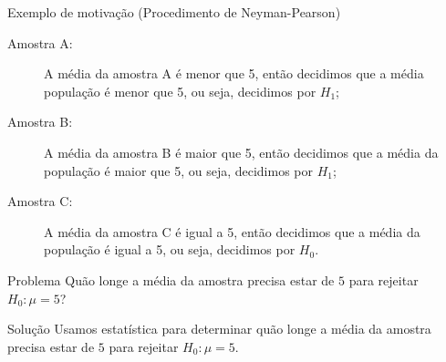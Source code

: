 \documentclass[8pt]{beamer}
\begin{document}
\begin{frame}{Exemplo de motivação (Procedimento de Neyman-Pearson)}

\begin{description}
 \item[Amostra A:] A média da amostra A é menor que 5, então decidimos que a média população é menor que 5, ou seja, decidimos por $H_1$;
 \vfill
 
 \item[Amostra B:] A média da amostra B é maior que 5, então decidimos que a média da população é maior que 5, ou seja, decidimos por $H_1$;
 \vfill
 
 \item[Amostra C:] A média da amostra C é igual a 5, então decidimos que a média da população é igual a 5, ou seja, decidimos por $H_0$.
\end{description}

\begin{block}{Problema}
	Quão longe a média da amostra precisa estar de $5$ para rejeitar $H_0: \mu = 5$?
\end{block}

\begin{block}{Solução}
	Usamos estatística para determinar quão longe a média da amostra precisa estar de $5$ para rejeitar $H_0: \mu = 5$.
\end{block}
 
\end{frame}
\end{document}
